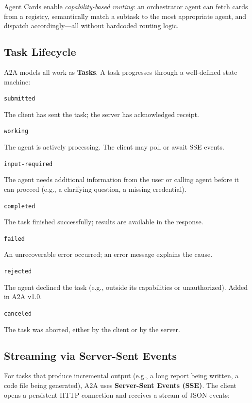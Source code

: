 Agent Cards enable \emph{capability-based routing}: an orchestrator agent can fetch cards from a registry, semantically match a subtask to the most appropriate agent, and dispatch accordingly---all without hardcoded routing logic.

\subsection{Task Lifecycle}
\label{task-lifecycle}

A2A models all work as \textbf{Tasks}. A task progresses through a well-defined state machine:

\texttt{submitted}

The client has sent the task; the server has acknowledged receipt.

\texttt{working}

The agent is actively processing. The client may poll or await SSE events.

\texttt{input-required}

The agent needs additional information from the user or calling agent before it can proceed (e.g., a clarifying question, a missing credential).

\texttt{completed}

The task finished successfully; results are available in the response.

\texttt{failed}

An unrecoverable error occurred; an error message explains the cause.

\texttt{rejected}

The agent declined the task (e.g., outside its capabilities or unauthorized). Added in A2A v1.0.

\texttt{canceled}

The task was aborted, either by the client or by the server.

\subsection{Streaming via Server-Sent Events}
\label{streaming-via-server-sent-events}

For tasks that produce incremental output (e.g., a long report being written, a code file being generated), A2A uses \textbf{Server-Sent Events (SSE)}. The client opens a persistent HTTP connection and receives a stream of JSON events:

